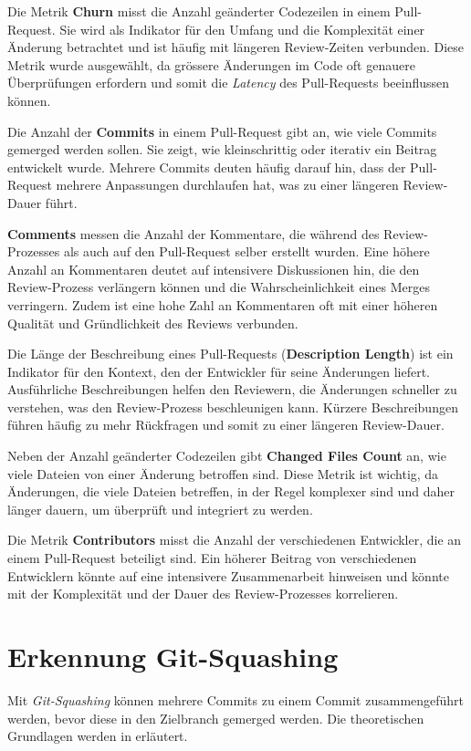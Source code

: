 Die Metrik \textbf{Churn} misst die Anzahl geänderter Codezeilen in einem Pull-Request. Sie wird als Indikator für den Umfang und die Komplexität einer Änderung betrachtet und ist häufig mit längeren Review-Zeiten verbunden. Diese Metrik wurde ausgewählt, da grössere Änderungen im Code oft genauere Überprüfungen erfordern und somit die \textit{Latency} des Pull-Requests beeinflussen können. \parencite{gousios_exploratory_2014}

Die Anzahl der \textbf{Commits} in einem Pull-Request gibt an, wie viele Commits gemerged werden sollen. Sie zeigt, wie kleinschrittig oder iterativ ein Beitrag entwickelt wurde. Mehrere Commits deuten häufig darauf hin, dass der Pull-Request mehrere Anpassungen durchlaufen hat, was zu einer längeren Review-Dauer führt. \parencite{zhang_pull_2022}

\textbf{Comments} messen die Anzahl der Kommentare, die während des Review-Prozesses als auch auf den Pull-Request selber erstellt wurden. Eine höhere Anzahl an Kommentaren deutet auf intensivere Diskussionen hin, die den Review-Prozess verlängern können und die Wahrscheinlichkeit eines Merges verringern. Zudem ist eine hohe Zahl an Kommentaren oft mit einer höheren Qualität und Gründlichkeit des Reviews verbunden. \parencite{tsay_influence_2014}

Die Länge der Beschreibung eines Pull-Requests (\textbf{Description Length}) ist ein Indikator für den Kontext, den der Entwickler für seine Änderungen liefert. Ausführliche Beschreibungen helfen den Reviewern, die Änderungen schneller zu verstehen, was den Review-Prozess beschleunigen kann. Kürzere Beschreibungen führen häufig zu mehr Rückfragen und somit zu einer längeren Review-Dauer. \parencite{zhang_pull_2022}

Neben der Anzahl geänderter Codezeilen gibt \textbf{Changed Files Count} an, wie viele Dateien von einer Änderung betroffen sind. Diese Metrik ist wichtig, da Änderungen, die viele Dateien betreffen, in der Regel komplexer sind und daher länger dauern, um überprüft und integriert zu werden. \parencite{tsay_influence_2014}

Die Metrik \textbf{Contributors} misst die Anzahl der verschiedenen Entwickler, die an einem Pull-Request beteiligt sind. Ein höherer Beitrag von verschiedenen Entwicklern könnte auf eine intensivere Zusammenarbeit hinweisen und könnte mit der Komplexität und der Dauer des Review-Prozesses korrelieren.

\section{Erkennung Git-Squashing}
\label{sec:ErkennungSquashing}
Mit \textit{Git-Squashing} können mehrere Commits zu einem Commit zusammengeführt werden, bevor diese in den Zielbranch gemerged werden. Die theoretischen Grundlagen werden in  erläutert. 

